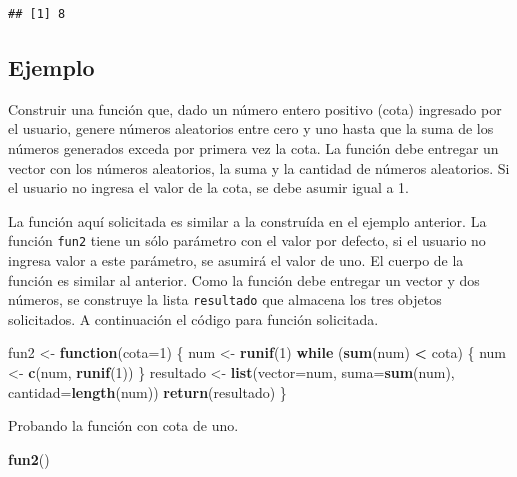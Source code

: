 \documentclass[10pt,]{krantz}
\makeatletter
\newenvironment{Shaded}{\begin{snugshade}}{\end{snugshade}}
\newcommand{\KeywordTok}[1]{\textcolor[rgb]{0.13,0.29,0.53}{\textbf{#1}}}
\newcommand{\DataTypeTok}[1]{\textcolor[rgb]{0.13,0.29,0.53}{#1}}
\newcommand{\DecValTok}[1]{\textcolor[rgb]{0.00,0.00,0.81}{#1}}
\newcommand{\StringTok}[1]{\textcolor[rgb]{0.31,0.60,0.02}{#1}}
\newcommand{\ControlFlowTok}[1]{\textcolor[rgb]{0.13,0.29,0.53}{\textbf{#1}}}
\newcommand{\OperatorTok}[1]{\textcolor[rgb]{0.81,0.36,0.00}{\textbf{#1}}}
\newcommand{\NormalTok}[1]{#1}
\newenvironment{kframe}{%
\medskip{}
\setlength{\fboxsep}{.8em}
 \def\at@end@of@kframe{}%
 \ifinner\ifhmode%
  \def\at@end@of@kframe{\end{minipage}}%
  \begin{minipage}{\columnwidth}%
 \fi\fi%
 \def\FrameCommand##1{\hskip\@totalleftmargin \hskip-\fboxsep
 \colorbox{shadecolor}{##1}\hskip-\fboxsep
     \hskip-\linewidth \hskip-\@totalleftmargin \hskip\columnwidth}%
 \MakeFramed {\advance\hsize-\width
   \@totalleftmargin\z@ \linewidth\hsize
   \@setminipage}}%
 {\par\unskip\endMakeFramed%
 \at@end@of@kframe}
\renewenvironment{Shaded}{\begin{kframe}}{\end{kframe}}
\makeatother
\begin{document}
\begin{verbatim}
## [1] 8
\end{verbatim}

\subsection*{Ejemplo}\label{ejemplo-22}


Construir una función que, dado un número entero positivo (cota)
ingresado por el usuario, genere números aleatorios entre cero y uno
hasta que la suma de los números generados exceda por primera vez la
cota. La función debe entregar un vector con los números aleatorios, la
suma y la cantidad de números aleatorios. Si el usuario no ingresa el
valor de la cota, se debe asumir igual a 1.

La función aquí solicitada es similar a la construída en el ejemplo
anterior. La función \texttt{fun2} tiene un sólo parámetro con el valor
por defecto, si el usuario no ingresa valor a este parámetro, se asumirá
el valor de uno. El cuerpo de la función es similar al anterior. Como la
función debe entregar un vector y dos números, se construye la lista
\texttt{resultado} que almacena los tres objetos solicitados. A
continuación el código para función solicitada.

\begin{Shaded}
\begin{Highlighting}[]
\NormalTok{fun2 <-}\StringTok{ }\ControlFlowTok{function}\NormalTok{(}\DataTypeTok{cota=}\DecValTok{1}\NormalTok{) \{}
\NormalTok{  num <-}\StringTok{ }\KeywordTok{runif}\NormalTok{(}\DecValTok{1}\NormalTok{)}
  \ControlFlowTok{while}\NormalTok{ (}\KeywordTok{sum}\NormalTok{(num) }\OperatorTok{<}\StringTok{ }\NormalTok{cota) \{}
\NormalTok{    num <-}\StringTok{ }\KeywordTok{c}\NormalTok{(num, }\KeywordTok{runif}\NormalTok{(}\DecValTok{1}\NormalTok{))}
\NormalTok{  \}}
\NormalTok{  resultado <-}\StringTok{ }\KeywordTok{list}\NormalTok{(}\DataTypeTok{vector=}\NormalTok{num,}
                    \DataTypeTok{suma=}\KeywordTok{sum}\NormalTok{(num),}
                    \DataTypeTok{cantidad=}\KeywordTok{length}\NormalTok{(num))}
  \KeywordTok{return}\NormalTok{(resultado)}
\NormalTok{\}}
\end{Highlighting}
\end{Shaded}

Probando la función con cota de uno.

\begin{Shaded}
\begin{Highlighting}[]
\KeywordTok{fun2}\NormalTok{()}
\end{Highlighting}
\end{Shaded}
\end{document}
